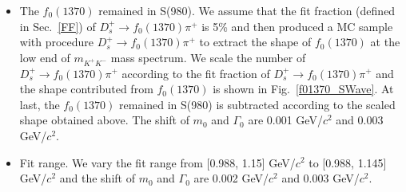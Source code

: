 {\begin{itemize}
        \item \uppercase\expandafter{} The $f_{0}(1370)$ remained in S(980). 
            We assume that the fit fraction (defined in Sec.~\ref{FF}) of $D_{s}^{+} \rightarrow f_{0}(1370)\pi^{+}$ is 5\% and then produced a MC sample with procedure $D_{s}^{+} \rightarrow f_{0}(1370)\pi^{+}$ to extract the shape of $f_{0}(1370)$ at the low end of $m_{K^{+}K^{-}}$ mass spectrum.
            We scale the number of $D_{s}^{+} \rightarrow f_{0}(1370)\pi^{+}$ according to the fit fraction of $D_{s}^{+} \rightarrow f_{0}(1370)\pi^{+}$ and the shape contributed from $f_{0}(1370)$ is shown in Fig.~\ref{f01370_SWave}.
            At last, the $f_{0}(1370)$ remained in S(980) is subtracted according to the scaled shape obtained above.
            The shift of $m_{0}$ and $\Gamma_{0}$ are 0.001 GeV/$c^{2}$ and 0.003 GeV/$c^{2}$.


        \item \uppercase\expandafter{} Fit range. We vary the fit range from [0.988, 1.15] GeV/$c^{2}$ to [0.988, 1.145] GeV/$c^{2}$ and the shift of $m_{0}$ and $\Gamma_{0}$ are 0.002 GeV/$c^{2}$ and 0.003 GeV/$c^{2}$.  

    \end{itemize}


}
